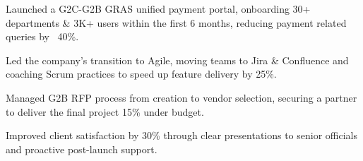 \documentclass[]{deedy-resume-reversed}
\begin{document}
\begin{minipage}[t]{0.60\textwidth}
\begin{tightemize}
\item Launched a G2C-G2B GRAS unified payment portal, onboarding 30+ departments \& 3K+ users within the first 6 months, reducing payment related queries by ~40\%.
\item Led the company's transition to Agile, moving teams to Jira \& Confluence and coaching Scrum practices to speed up feature delivery by 25\%.
\item Managed G2B RFP process from creation to vendor selection, securing a partner to deliver the final project 15\% under budget.
\item Improved client satisfaction by 30\% through clear presentations to senior officials and proactive post-launch support.
\end{tightemize}
\sectionsep






\end{minipage}
\end{document}
